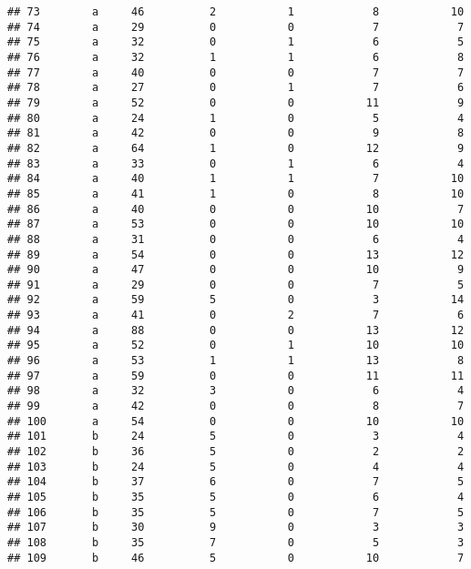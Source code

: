\documentclass[
]{article}
\begin{document}
\begin{verbatim}
## 73        a     46          2           1            8           10
## 74        a     29          0           0            7            7
## 75        a     32          0           1            6            5
## 76        a     32          1           1            6            8
## 77        a     40          0           0            7            7
## 78        a     27          0           1            7            6
## 79        a     52          0           0           11            9
## 80        a     24          1           0            5            4
## 81        a     42          0           0            9            8
## 82        a     64          1           0           12            9
## 83        a     33          0           1            6            4
## 84        a     40          1           1            7           10
## 85        a     41          1           0            8           10
## 86        a     40          0           0           10            7
## 87        a     53          0           0           10           10
## 88        a     31          0           0            6            4
## 89        a     54          0           0           13           12
## 90        a     47          0           0           10            9
## 91        a     29          0           0            7            5
## 92        a     59          5           0            3           14
## 93        a     41          0           2            7            6
## 94        a     88          0           0           13           12
## 95        a     52          0           1           10           10
## 96        a     53          1           1           13            8
## 97        a     59          0           0           11           11
## 98        a     32          3           0            6            4
## 99        a     42          0           0            8            7
## 100       a     54          0           0           10           10
## 101       b     24          5           0            3            4
## 102       b     36          5           0            2            2
## 103       b     24          5           0            4            4
## 104       b     37          6           0            7            5
## 105       b     35          5           0            6            4
## 106       b     35          5           0            7            5
## 107       b     30          9           0            3            3
## 108       b     35          7           0            5            3
## 109       b     46          5           0           10            7

\end{verbatim}
\end{document}
